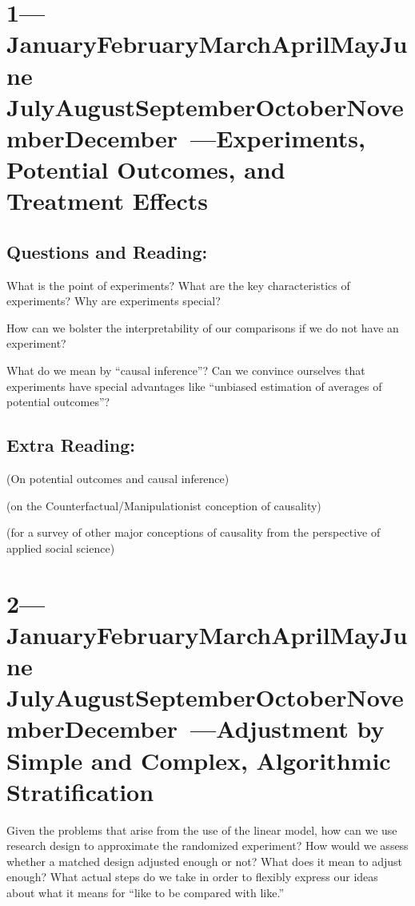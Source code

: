 \documentclass[10pt, letterpaper]{article}
\def\themonth{\ifcase\month\or
  January\or February\or March\or April\or May\or June\or
  July\or August\or September\or October\or November\or December\fi}
\begin{document}
\SetDate[14/07/2014]
\section{1---\themonth~\the\day---Experiments, Potential Outcomes, and Treatment Effects}

\subsection{Questions and Reading:}

What is the point of experiments? What are the key characteristics of
experiments? Why are experiments special?

\citealp{kinder1993behalf}

\citealp[Chap 1]{gerber2012field}

How can we bolster the interpretability of our comparisons if we do not have
an experiment? 

\citealp[Chap 1]{rosenbaum2010design}

What do we mean by ``causal inference''? Can we convince ourselves that
experiments have special advantages like ``unbiased estimation of averages of
potential outcomes''?

\citealp[Chap 2]{gerber2012field}

\subsection{Extra Reading:}

\citealp[Chap 9.0 --  9.3]{gelman2007dau} (On potential outcomes and causal
inference)


\citealp[Chap 2]{angrist2009mostly}

\citealp{holland:1986a} (on the Counterfactual/Manipulationist conception of
causality)

\citealp{brady02} (for a survey of other major conceptions of causality from
the perspective of applied social science)



\AdvanceDate[1]
\section{2---\themonth~\the\day---Adjustment by Simple and Complex, Algorithmic Stratification }

Given the problems that arise from the use of the linear model, how can we use
research design to approximate the randomized experiment? How would we assess
whether a matched design adjusted enough or not? What does it mean to adjust
enough? What actual steps do we take in order to flexibly express our ideas
about what it means for ``like to be compared with like.''
\end{document}
